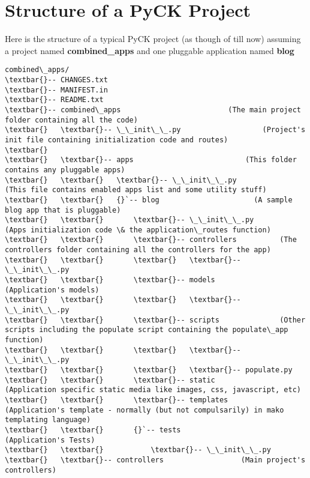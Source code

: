 \documentclass[letterpaper,10pt,english]{sphinxmanual}
\begin{document}
\chapter{Structure of a PyCK Project}
\label{pyck-project-structure::doc}\label{pyck-project-structure:pyck-project-structure}\label{pyck-project-structure:structure-of-a-pyck-project}
Here is the structure of a typical PyCK project (as though of till now) assuming a project named \textbf{combined\_apps} and one pluggable application named \textbf{blog}

\begin{Verbatim}[commandchars=\\\{\}]
combined\_apps/
\textbar{}-- CHANGES.txt
\textbar{}-- MANIFEST.in
\textbar{}-- README.txt
\textbar{}-- combined\_apps                         (The main project folder containing all the code)
\textbar{}   \textbar{}-- \_\_init\_\_.py                   (Project's init file containing initialization code and routes)
\textbar{}
\textbar{}   \textbar{}-- apps                          (This folder contains any pluggable apps)
\textbar{}   \textbar{}   \textbar{}-- \_\_init\_\_.py               (This file contains enabled apps list and some utility stuff)
\textbar{}   \textbar{}   {}`-- blog                      (A sample blog app that is pluggable)
\textbar{}   \textbar{}       \textbar{}-- \_\_init\_\_.py          (Apps initialization code \& the application\_routes function)
\textbar{}   \textbar{}       \textbar{}-- controllers          (The controllers folder containing all the controllers for the app)
\textbar{}   \textbar{}       \textbar{}   \textbar{}-- \_\_init\_\_.py
\textbar{}   \textbar{}       \textbar{}-- models               (Application's models)
\textbar{}   \textbar{}       \textbar{}   \textbar{}-- \_\_init\_\_.py
\textbar{}   \textbar{}       \textbar{}-- scripts              (Other scripts including the populate script containing the populate\_app function)
\textbar{}   \textbar{}       \textbar{}   \textbar{}-- \_\_init\_\_.py
\textbar{}   \textbar{}       \textbar{}   \textbar{}-- populate.py
\textbar{}   \textbar{}       \textbar{}-- static               (Application specific static media like images, css, javascript, etc)
\textbar{}   \textbar{}       \textbar{}-- templates            (Application's template - normally (but not compulsarily) in mako templating language)
\textbar{}   \textbar{}       {}`-- tests                (Application's Tests)
\textbar{}   \textbar{}           \textbar{}-- \_\_init\_\_.py
\textbar{}   \textbar{}-- controllers                  (Main project's controllers)

\end{Verbatim}
\end{document}
